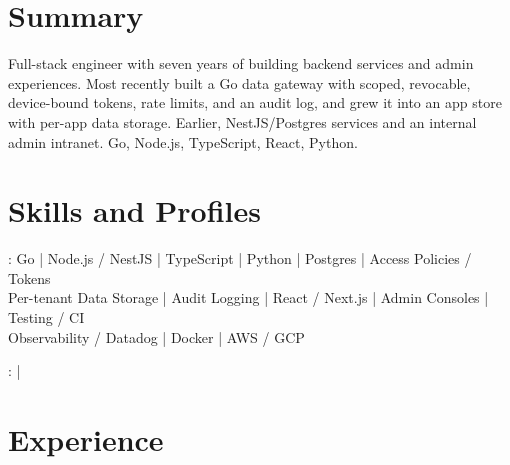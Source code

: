 \documentclass[print]{jack-resume}
\begin{document}
\pagecolor{darkmodeBackground}


\begin{minipage}[t][1cm][t]{.03\textwidth}
    \hfill
\end{minipage}

\section{Summary}
Full-stack engineer with seven years of building backend services and admin experiences. Most recently built a Go data gateway with scoped, revocable, device-bound tokens, rate limits, and an audit log, and grew it into an app store with per-app data storage. Earlier, NestJS/Postgres services and an internal admin intranet. Go, Node.js, TypeScript, React, Python.
\sectionsep

\section{Skills and Profiles}
:
Go \hfill | \hfill
Node.js / NestJS \hfill | \hfill
TypeScript \hfill | \hfill
Python \hfill | \hfill
Postgres \hfill | \hfill
Access Policies / Tokens \\
\hspace{1.0cm} Per-tenant Data Storage \hfill | \hfill
Audit Logging \hfill | \hfill
React / Next.js \hfill | \hfill
Admin Consoles \hfill | \hfill
Testing / CI \\
\hspace{1.0cm} Observability / Datadog \hfill | \hfill
Docker \hfill | \hfill
AWS / GCP \\

\raggedright{
    :
      \href{https://www.linkedin.com/in/jack-sturtevant/}{ \ExternalLink} |
     \href{https://github.com/jacksturt}{ \ExternalLink}}

\section{Experience}
\end{document}
